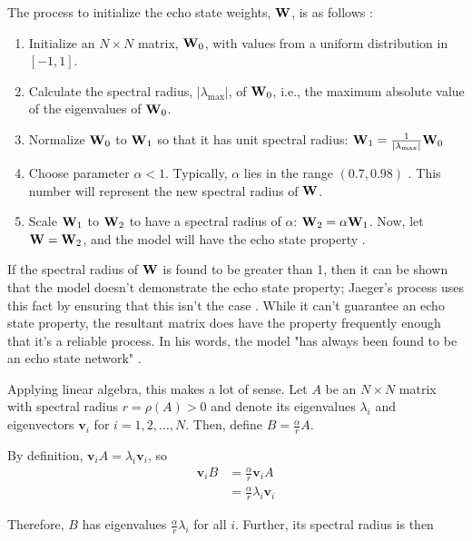 \documentclass{article}
\begin{document}
The process to initialize the echo state weights, $\mathbf{W}$, is as follows
\cite{jaeger2002tutorial}:

\newcommand{\specrad}{\vert \lambda_\text{max} \vert}
\begin{enumerate}
    \item Initialize an $N \times N$ matrix, $\mathbf{W}_0$, with values from a 
    uniform distribution in $[-1, 1]$.
    \item Calculate the spectral radius, $\specrad$, of $\mathbf{W}_0$, i.e., the 
    maximum absolute value of the eigenvalues of $\mathbf{W}_0$.
    \item Normalize $\mathbf{W}_0$ to $\mathbf{W}_1$ so that it has unit spectral radius:
    $\W_1 = \frac{1}{\specrad} \W_0$
    \item Choose parameter $\alpha < 1$. Typically, $\alpha$ lies in
    the range $(0.7, 0.98)$ \cite{jaeger2002tutorial}. This number will 
    represent the new spectral radius of $\mathbf{W}$.
    \item Scale $\mathbf{W}_1$ to $\mathbf{W}_2$ to have a spectral radius of
    $\alpha$: $\mathbf{W}_2 = \alpha \mathbf{W}_1$. Now, let $\mathbf{W} = \mathbf{W}_2$, and the model
    will have the echo state property \cite{jaeger2002tutorial}.
\end{enumerate}

If the spectral radius of $\mathbf{W}$ is found to be greater than 1, then it can be
shown that the model doesn't demonstrate the echo state property; Jaeger's
process uses this fact by ensuring that this isn't the case
\cite{jaeger2002tutorial}. While it can't guarantee an echo state property,
the resultant matrix does have the property frequently enough that it's a
reliable process. In his words, the model "has always been found to be an
echo state network" \cite{jaeger2002tutorial}.

\newcommand{\vv}{\mathbf{v}}

Applying linear algebra, this makes a lot of sense. Let $A$ be an $N \times
N$ matrix with spectral radius $r = \rho(A) > 0$ and denote its eigenvalues
$\lambda_i$ and eigenvectors $\vv_i$ for $i = 1, 2, \dots, N$. Then, define
$B = \frac{\alpha}{r} A$.

By definition, $\vv_i A = \lambda_i \vv_i$, so
\begin{align*}
   \vv_i B &= \frac{\alpha}{r} \vv_i A \\
   &= \frac{\alpha}{r} \lambda_i \vv_i
\end{align*}

Therefore, $B$ has eigenvalues $\frac{\alpha}{r} \lambda_i$ for all $i$.
Further, its spectral radius is then
\end{document}
